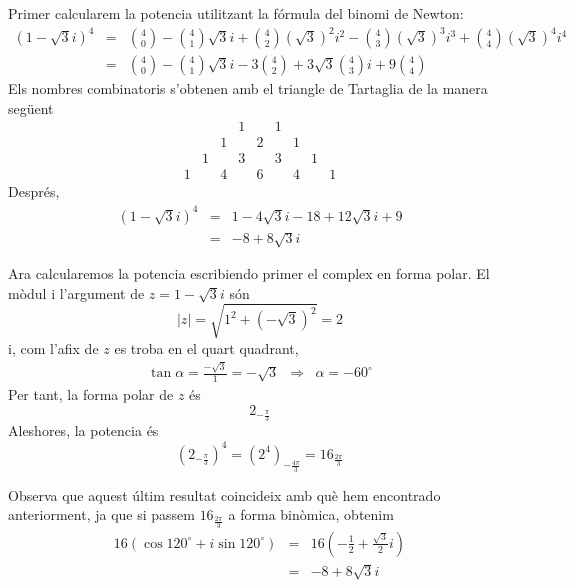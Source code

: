 \begin{solucio}
Primer calcularem la potencia utilitzant la fórmula del binomi de
Newton:
\begin{eqnarray*}
(1-\sqrt{3}i)^{4} &=&\binom{4}{0}-\binom{4}{1}\sqrt{3}i+\binom{4}{2}\left(
\sqrt{3}\right) ^{2}i^{2}-\binom{4}{3}\left( \sqrt{3}\right) ^{3}i^{3}+
\binom{4}{4}\left( \sqrt{3}\right) ^{4}i^{4} \\
&=&\binom{4}{0}-\binom{4}{1}\sqrt{3}i-3\binom{4}{2}+3\sqrt{3}\binom{4}{3}i+9
\binom{4}{4}
\end{eqnarray*}
Els nombres combinatoris s’obtenen amb el triangle de Tartaglia
de la manera següent
\begin{equation*}
\begin{array}{lllllllll}
&  &  & 1 &  & 1 &  &  &  \\
&  & 1 &  & 2 &  & 1 &  &  \\
& 1 &  & 3 &  & 3 &  & 1 &  \\
1 &  & 4 &  & 6 &  & 4 &  & 1
\end{array}
\end{equation*}
Després,
\begin{eqnarray*}
(1-\sqrt{3}i)^{4} &=&1-4\sqrt{3}i-18+12\sqrt{3}i+9 \\
&=&-8+8\sqrt{3}i
\end{eqnarray*}

Ara calcularemos la potencia escribiendo primer el complex en forma
polar. El mòdul i l’argument de $z=1-\sqrt{3}i$ són
\begin{equation*}
\left\vert z\right\vert =\sqrt{1^{2}+\left( -\sqrt{3}\right) ^{2}}=2
\end{equation*}
i, com l’afix de $z$ es troba en el quart quadrant,
\begin{equation*}
\begin{array}{lll}
\tan \alpha =\frac{-\sqrt{3}}{1}=-\sqrt{3} & \Longrightarrow & \alpha =-60
^{\circ}
\end{array}
\end{equation*}
Per tant, la forma polar de $z$ és
\begin{equation*}
2_{-\frac{\pi }{3}}
\end{equation*}
Aleshores, la potencia és
\begin{equation*}
\left( 2_{-\frac{\pi }{3}}\right) ^{4}=\left( 2^{4}\right) _{-\frac{4\pi }{3}
}=16_{\frac{2\pi }{3}}
\end{equation*}

Observa que aquest últim resultat coincideix amb què hem encontrado
anteriorment, ja que si passem $16_{\frac{2\pi }{3}}$ a forma binòmica,
obtenim
\begin{eqnarray*}
16(\cos 120
^{\circ}
+i\sin 120
^{\circ}
) &=&16\left( -\frac{1}{2}+\frac{\sqrt{3}}{2}i\right) \\
&=&-8+8\sqrt{3}i
\end{eqnarray*}
\end{solucio}

